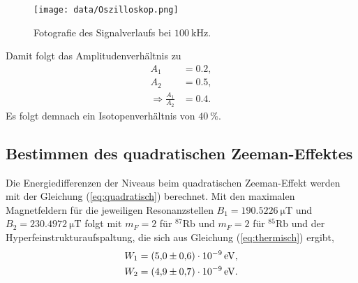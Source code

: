 \begin{figure}[H]
    \centering
    \texttt{[image: data/Oszilloskop.png]}
    \caption{Fotografie des Signalverlaufs bei $\SI{100}{\kilo\hertz}$.}
    \label{fig:Oszilloskop}
\end{figure}

Damit folgt das Amplitudenverhältnis zu
\begin{align*}
    A_1 &= 0.2, \\
    A_2 &= 0.5, \\
    \Rightarrow \frac{A_1}{A_2} &= 0.4.
\end{align*}
Es folgt demnach ein Isotopenverhältnis von $\SI{40}{\percent}$.

\subsection{Bestimmen des quadratischen Zeeman-Effektes}
\label{subsec:quadrZeeman}

Die Energiedifferenzen der Niveaus beim quadratischen Zeeman-Effekt werden mit der Gleichung (\ref{eq:quadratisch}) berechnet.
Mit den maximalen Magnetfeldern für die jeweiligen Resonanzstellen $B_1 = \SI{190.5226}{\micro\tesla}$ und $B_2 = \SI{230.4972}{\micro\tesla}$ folgt mit $m_F=2$ für $^{87}\text{Rb}$
und $m_F = 2$ für $^{85}\text{Rb}$ und der Hyperfeinstrukturaufspaltung, die sich aus Gleichung (\ref{eq:thermisch}) ergibt,
\begin{align*}
    W_1 &= \SI{5.0+-0.6 e-09}{\eV}, \\
    W_2 &= \SI{4.9+-0.7 e-09}{\eV}.
\end{align*}